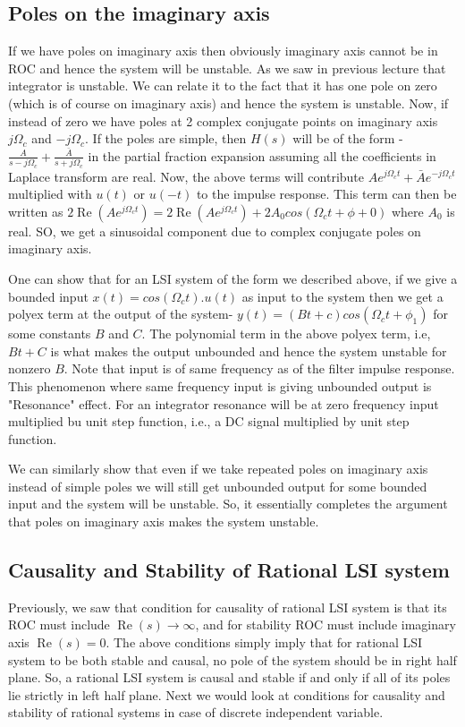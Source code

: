 \subsection{Poles on the imaginary axis}
If we have poles on imaginary axis then obviously imaginary axis cannot be in ROC and hence the system will be unstable. As we saw in previous lecture that integrator is unstable. We can relate it to the fact that it has one pole on zero (which is of course on imaginary axis) and hence the system is unstable. Now, if instead of zero we have poles at 2 complex conjugate points on imaginary axis $j\Omega_{c}$ and $-j\Omega_{c}$. If the poles are simple, then $H(s)$ will be of the form - $\frac{A}{s-j\Omega_{c}} + \frac{\bar{A}}{s+j\Omega_{c}}$ in the partial fraction expansion assuming all the coefficients in Laplace transform are real. Now, the above terms will contribute $Ae^{j\Omega_{c}t} + \bar{A}e^{-j\Omega_{c}t}$ multiplied with $u(t)$ or $u(-t)$ to the impulse response. This term can then be written as $2\operatorname{Re}(Ae^{j\Omega_{c}t}) = 2\operatorname{Re}(Ae^{j\Omega_{c}t}) + 2A_{0}cos(\Omega_{c}t + \phi+{0})$ where $A_{0}$ is real. SO, we get a sinusoidal component due to complex conjugate poles on imaginary axis. 
\par One can show that for an LSI system of the form we described above, if we give a bounded input $x(t) = cos(\Omega_{c}t).u(t)$ as input to the system then we get a polyex term at the output of the system- $y(t) = (Bt + c)cos(\Omega_{c}t + \phi_{1})$ for some constants $B$ and $C$. The polynomial term in the above polyex term, i.e, $Bt + C$ is what makes the output unbounded and hence the system unstable for nonzero $B$. Note that input is of same frequency as of the filter impulse response. This phenomenon where same frequency input is giving unbounded output is "Resonance" effect. For an integrator resonance will be at zero frequency input multiplied bu unit step function, i.e., a DC signal multiplied by unit step function.
\par We can similarly show that even if we take repeated poles on imaginary axis instead of simple poles we will still get unbounded output for some bounded input and the system will be unstable. So, it essentially completes the argument that poles on imaginary axis makes the system unstable.

\subsection{Causality and Stability of Rational LSI system}
Previously, we saw that condition for causality of rational LSI system is that its ROC must include $\operatorname{Re}(s) \to \infty$, and for stability ROC must include imaginary axis $\operatorname{Re}(s) = 0$. The above conditions simply imply that for rational LSI system to be both stable and causal, no pole of the system should be in right half plane. So, a rational LSI system is causal and stable if and only if all of its poles lie strictly in left half plane. Next we would look at conditions for causality and stability of rational systems in case of discrete independent variable.

